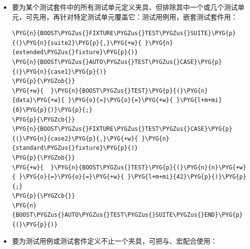 \begin{itemize}

\item 要为某个测试套件中的所有测试单元定义夹具、但排除其中一个或几个测试单元，可先用，再针对特定测试单元覆盖它：测试用例用，嵌套测试套件用：



\begin{codeblockbg}
\begin{Verbatim}[commandchars=\\\{\},breaklines=true,breakanywhere=true,fontsize=\codefont,xleftmargin=17bp]
\PYG{n}{BOOST\PYGZus{}FIXTURE\PYGZus{}TEST\PYGZus{}SUITE}\PYG{p}{(}\PYG{n}{suite2}\PYG{p}{,}\PYG{+w}{ }\PYG{n}{extended\PYGZus{}fixture}\PYG{p}{)}
\PYG{n}{BOOST\PYGZus{}AUTO\PYGZus{}TEST\PYGZus{}CASE}\PYG{p}{(}\PYG{n}{case1}\PYG{p}{)}
\PYG{p}{\PYGZob{}}
\PYG{+w}{  }\PYG{n}{BOOST\PYGZus{}TEST}\PYG{p}{(}\PYG{n}{data}\PYG{+w}{ }\PYG{o}{=}\PYG{o}{=}\PYG{+w}{ }\PYG{l+m+mi}{0}\PYG{p}{)}\PYG{p}{;}
\PYG{p}{\PYGZcb{}}
\PYG{n}{BOOST\PYGZus{}FIXTURE\PYGZus{}TEST\PYGZus{}CASE}\PYG{p}{(}\PYG{n}{case2}\PYG{p}{,}\PYG{+w}{ }\PYG{n}{standard\PYGZus{}fixture}\PYG{p}{)}
\PYG{p}{\PYGZob{}}
\PYG{+w}{  }\PYG{n}{BOOST\PYGZus{}TEST}\PYG{p}{(}\PYG{n}{n}\PYG{+w}{ }\PYG{o}{=}\PYG{o}{=}\PYG{+w}{ }\PYG{l+m+mi}{42}\PYG{p}{)}\PYG{p}{;}
\PYG{p}{\PYGZcb{}}
\PYG{n}{BOOST\PYGZus{}AUTO\PYGZus{}TEST\PYGZus{}SUITE\PYGZus{}END}\PYG{p}{(}\PYG{p}{)}
\end{Verbatim}
\end{codeblockbg}



\item 要为测试用例或测试套件定义不止一个夹具，可把与、宏配合使用：




\end{itemize}
